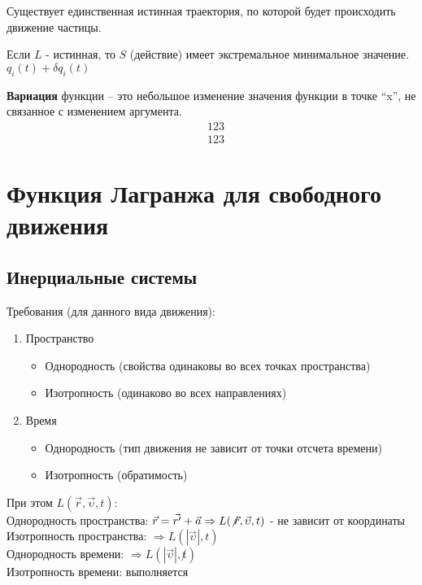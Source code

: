 \documentclass[a4paper,12pt]{report}
\begin{document}
Существует единственная истинная траектория, по которой будет происходить движение частицы.

Если $L$ - истинная, то $S$ (действие) имеет экстремальное минимальное значение. $q_i(t)+\delta q_i(t)$

\textbf{Вариация} функции – это небольшое изменение значения функции в точке “x”, не связанное с изменением аргумента.
\begin{equation}
\begin{aligned}
&123\\
&123
\end{aligned}
\end{equation}

\section{Функция Лагранжа для свободного движения}
\subsection{Инерциальные системы}
Требования (для данного вида движения):
\begin{enumerate}
  \item Пространство
  \begin{itemize}
  \item Однородность (свойства одинаковы во всех точках пространства)
  \item Изотропность (одинаково во всех направлениях)
\end{itemize}
  \item Время
  \begin{itemize}
  \item Однородность (тип движения не зависит от точки отсчета времени)
  \item Изотропность (обратимость)
\end{itemize}
\end{enumerate}

При этом $L(\vec{r}, \vec{\upsilon}, t)$:\\
Однородность пространства: $\vec{r}=\vec{r'}+\vec{a} \Rightarrow L(\not \vec{r}, \vec{\upsilon}, t)$ - не зависит от координаты\\
Изотропность пространства: $\Rightarrow L(|\vec{\upsilon}|, t)$\\
Однородность времени: $\Rightarrow L(|\vec{\upsilon}|, \not t)$\\
Изотропность времени: выполняется\\
\\
\end{document}
